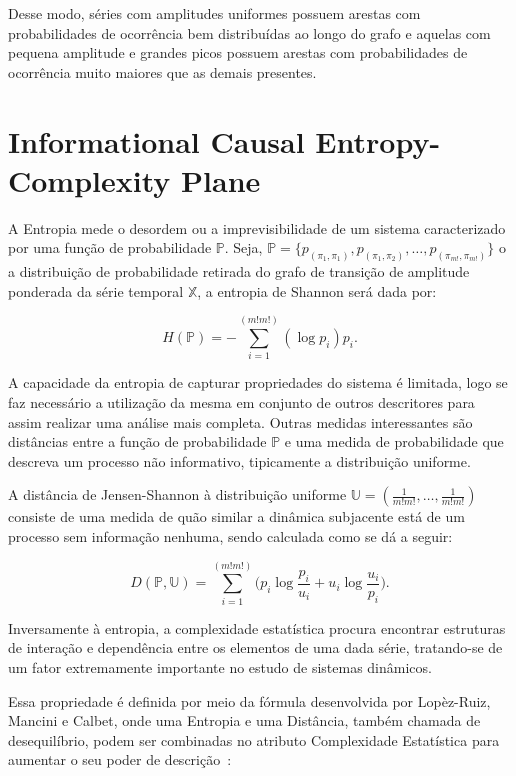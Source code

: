\documentclass[12pt]{article}
\begin{document}
Desse modo, séries com amplitudes uniformes possuem arestas com probabilidades de ocorrência bem distribuídas ao longo do grafo e aquelas com pequena amplitude e grandes picos possuem arestas com probabilidades de ocorrência muito maiores que as demais presentes.

\section{Informational Causal Entropy-Complexity Plane}\label{HC}

A Entropia mede o desordem ou a imprevisibilidade de um sistema caracterizado por uma função de probabilidade $\mathbb{P}$.
Seja, $\mathbb{P} = \{p_{(\pi_1, \pi_1)}, p_{(\pi_1, \pi_2)}, \dots, p_{(\pi_{m!}, \pi_{m!})}\}$ o a distribuição de probabilidade retirada do grafo de transição de amplitude ponderada da série temporal $\mathbb{X}$, a entropia de Shannon será dada por:

\begin{equation}
H(\mathbb{P}) = -\sum_{i=1}^{(m!m!)} (\log p_i) p_i.
\label{eq:Entropia}
\end{equation}

A capacidade da entropia de capturar propriedades do sistema é limitada, logo se faz necessário a utilização da mesma em conjunto de outros descritores para assim realizar uma análise mais completa.
Outras medidas interessantes são distâncias entre a função de probabilidade $\mathbb{P}$ e uma medida de probabilidade que descreva um processo não informativo, tipicamente a distribuição uniforme.

A distância de Jensen-Shannon à distribuição uniforme $ \mathbb{U} = (\frac{1}{m!m!},\dots,\frac{1}{m!m!})$ consiste de uma medida de quão similar a dinâmica subjacente está de um processo sem informação nenhuma, sendo calculada como se dá a seguir:

\begin{equation}
D(\mathbb{P}, \mathbb{U}) = \sum_{i=1}^{(m!m!)} \Big(p_i \log\frac{p_i}{u_i} +
u_i \log\frac{u_i}{p_i}
\Big).
\end{equation}

Inversamente à entropia, a complexidade estatística procura encontrar estruturas de interação e dependência entre os elementos de uma dada série, tratando-se de um fator extremamente importante no estudo de sistemas dinâmicos.

Essa propriedade é definida por meio da fórmula desenvolvida por Lopèz-Ruiz, Mancini e Calbet, onde uma Entropia e uma Distância, também chamada de desequilíbrio, podem ser combinadas no atributo Complexidade Estatística para aumentar o seu poder de descrição~\citep{Feldman2008information,Feldman1998Statistical,Lopez1995statistical}:
\end{document}
